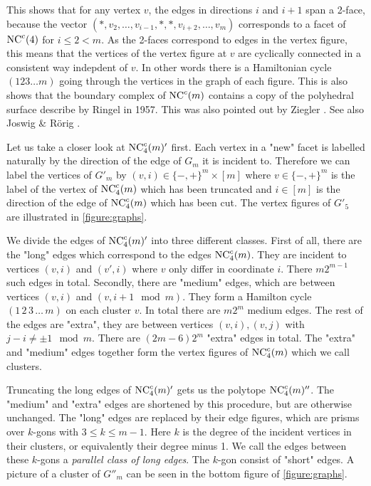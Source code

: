  This shows that for any vertex $v$, the edges in directions $i$ and $i+1$ span a 2-face, because
the vector $(*,v_2, \dots, v_{i-1}, *, *, v_{i+2}, \dots, v_m)$ corresponds to a facet of $\mathrm{NC}^c(4)$
for $i\le 2 < m$. As the 2-faces correspond to edges in the vertex figure, this means that the vertices 
of the vertex figure at $v$ are cyclically connected in a consistent way indepdent of $v$. In other words
there is a Hamiltonian cycle $(123\dots m)$ going through the vertices in the graph of each figure.
This is also shows that the boundary complex of $\mathrm{NC}^c(m)$ contains a copy of the polyhedral surface 
describe by Ringel \cite{ringel55:_ueber_probl_wuerf_wuerf} in 1957. This was also pointed out by
Ziegler \cite[Sect 3.]{Z100}. See also Joswig \& Rörig \cite{joswig:_neigh}.

Let us take a closer look at $\mathrm{NC}^c_4(m)'$ first.  Each vertex in a "new" facet is labelled naturally by
the direction of the edge of $G_m$ it is incident to. Therefore we can label the vertices of $G'_m$
by $(v,i) \in \{-,+\}^m \times [m]$ where $v \in \{-,+\}^m$ is the label of the vertex of $\mathrm{NC}^c_4(m)$ which has been truncated and $i \in [m]$ 
is the direction of the edge of $\mathrm{NC}^c_4(m)$ which has been cut. The vertex figures of $G'_5$ are illustrated in \ref{figure:graphs}.

We divide the edges of $\mathrm{NC}^c_4(m)'$ into three different classes. First of all, there are the "long" edges which correspond to the edges $\mathrm{NC}^c_4(m)$.
They are incident to vertices $(v,i)$ and $(v',i)$ where $v$ only differ in coordinate $i$. There $m2^{m-1}$ such edges in total. Secondly, 
there are "medium" edges, which are between vertices $(v,i)$ and $(v,i+1\mod m)$. They form a Hamilton cycle $(1\,2\,3\,\dots\, m)$ on each cluster $v$. In total there are $m2^m$ medium edges. The rest of the edges are "extra", they are between vertices $(v,i), (v,j)$ with $j-i \neq \pm 1 \mod m$.
There are $(2m-6)2^m$ "extra" edges in total. The "extra" and "medium" edges together form the vertex figures of $\mathrm{NC}^c_4(m)$ which we call clusters. 

Truncating the long edges of $\mathrm{NC}^c_4(m)'$ gets us the polytope $\mathrm{NC}^c_4(m)''$. The "medium" and "extra" edges are shortened by this procedure, but are otherwise unchanged. The "long" edges are replaced by their edge figures, which are prisms over $k$-gons with $3 \le k \le m-1$. Here $k$ is the degree of the incident vertices in their clusters, or equivalently their degree minus 1. We call the edges between these $k$-gons a \textit{parallel class of long edges}. The $k$-gon consist of "short" edges. A picture of a cluster of $G''_m$ can be seen in the bottom figure of \ref{figure:graphs}.

